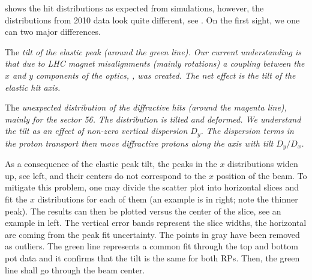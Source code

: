 
 shows the hit distributions as expected from simulations, however, the distributions from 2010 data look quite different, see . On the first sight, we one can two major differences.

\> The \em{tilt of the elastic peak} (around the green line). Our current understanding is that due to LHC magnet misalignments (mainly rotations) a coupling between the $x$ and $y$ components of the optics, , was created. The net effect is the tilt of the elastic hit axis.

\> The \em{unexpected distribution of the diffractive hits} (around the magenta line), mainly for the sector 56. The distribution is tilted and deformed. We understand the tilt as an effect of non-zero vertical dispersion $D_y$. The dispersion terms in the proton transport  then move diffractive protons along the axis with tilt $D_y/D_x$.


As a consequence of the elastic peak tilt, the peaks in the $x$ distributions widen up, see  left, and their centers do not correspond to the $x$ position of the beam. To mitigate this problem, one may divide the scatter plot into horizontal slices and fit the $x$ distributions for each of them (an example is in  right; note the thinner peak). The results can then be plotted versus the center of the slice, see an example in  left. The vertical error bands represent the slice widths, the horizontal are coming from the peak fit uncertainty. The points in gray have been removed as outliers. The green line represents a common fit through the top and bottom pot data and it confirms that the tilt is the same for both RPs. Then, the green line shall go through the beam center.


